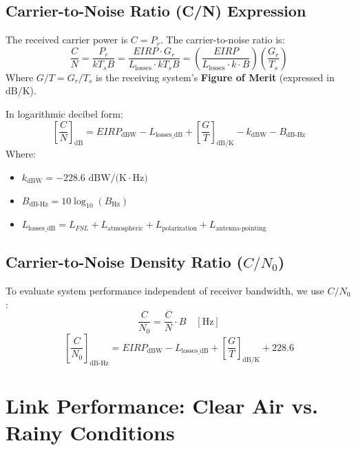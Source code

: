 \documentclass[12pt,a4paper]{article}
\begin{document}
\subsection{Carrier-to-Noise Ratio (C/N) Expression}
The received carrier power is $C = P_r$. The carrier-to-noise ratio is:
\begin{equation}
  \frac{C}{N} = \frac{P_r}{k T_s B} = \frac{EIRP \cdot G_r}{L_{\text{losses}} \cdot k T_s B} = \left(\frac{EIRP}{L_{\text{losses}} \cdot k \cdot B}\right) \left(\frac{G_r}{T_s}\right)
\end{equation}
Where $G/T = G_r/T_s$ is the receiving system's \textbf{Figure of Merit} (expressed in $\text{dB/K}$).

In logarithmic decibel form:
\begin{equation}
  \left[\frac{C}{N}\right]_{\text{dB}} = EIRP_{\text{dBW}} - L_{\text{losses\_dB}} + \left[\frac{G}{T}\right]_{\text{dB/K}} - k_{\text{dBW}} - B_{\text{dB-Hz}}
\end{equation}
Where:
\begin{itemize}[leftmargin=*, itemsep=3pt]
  \item $k_{\text{dBW}} = -228.6 \text{ dBW/(K}\cdot\text{Hz)}$
  \item $B_{\text{dB-Hz}} = 10\log_{10}(B_{\text{Hz}})$
  \item $L_{\text{losses\_dB}} = L_{FSL} + L_{\text{atmospheric}} + L_{\text{polarization}} + L_{\text{antenna-pointing}}$
\end{itemize}

\subsection{Carrier-to-Noise Density Ratio ($C/N_0$)}
To evaluate system performance independent of receiver bandwidth, we use $C/N_0$:
\begin{equation}
  \frac{C}{N_0} = \frac{C}{N} \cdot B \quad [\text{Hz}]
\end{equation}
\begin{equation}
  \left[\frac{C}{N_0}\right]_{\text{dB-Hz}} = EIRP_{\text{dBW}} - L_{\text{losses\_dB}} + \left[\frac{G}{T}\right]_{\text{dB/K}} + 228.6
\end{equation}

\section{Link Performance: Clear Air vs. Rainy Conditions}
\end{document}
